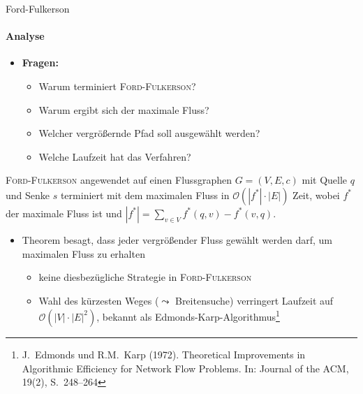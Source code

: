 \documentclass{vorlesung}
\newcommand{\mrk}[1]{\textcolor{ubrot}{\bfseries #1}}
\newcommand{\ovon}[1]{\ensuremath{\mathcal{O}(#1)}}
\begin{document}
%
\begin{frame}{Ford-Fulkerson}
\framesubtitle{Analyse}
\begin{itemize}\vspace*{-3mm}
	\item \mrk{Fragen:} 
	\begin{itemize}
	  \item Warum terminiert \textsc{Ford-Fulkerson}?
	  \item Warum ergibt sich der maximale Fluss?
	  \item Welcher vergrößernde Pfad soll ausgewählt werden?
	  \item Welche Laufzeit hat das Verfahren?
	 \end{itemize}
\end{itemize}\vspace*{-3mm}
\begin{theorem}
\textsc{Ford-Fulkerson} angewendet auf einen Flussgraphen $G=(V,E,c)$ mit Quelle $q$ und Senke $s$ terminiert mit dem maximalen Fluss in \ovon{|f^*| \cdot |E|} Zeit, wobei $f^*$ der maximale Fluss ist und $|f^*| = \sum_{v\in V} f^*(q,v) - f^*(v,q)$.
\end{theorem}
\begin{itemize}\vspace*{-2mm}
	\item Theorem besagt, dass jeder vergrößender Fluss gewählt werden darf, um maximalen Fluss zu erhalten
	\begin{itemize}
		\item keine diesbezügliche Strategie in \textsc{Ford-Fulkerson}
		\item Wahl des kürzesten Weges ($\leadsto$ Breitensuche) verringert Laufzeit auf \ovon{|V|\cdot |E|^2}, bekannt als Edmonds-Karp-Algorithmus\footnote{\scriptsize J.\ Edmonds und R.M.\ Karp (1972). Theoretical Improvements in Algorithmic Efficiency for Network Flow Problems. In: Journal of the ACM, 19(2), S.\ 248--264}
	\end{itemize}
\end{itemize}
\end{frame}
%
\end{document}
